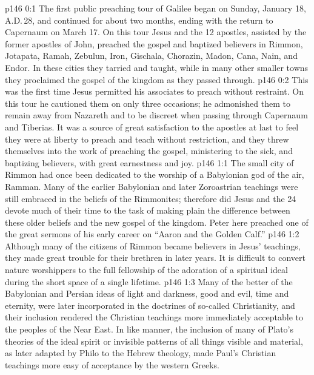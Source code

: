 \author{Midwayer Commission}
\vs p146 0:1 The first public preaching tour of Galilee began on Sunday, January 18, A.D.\,28, and continued for about two months, ending with the return to Capernaum on March 17. On this tour Jesus and the 12 apostles, assisted by the former apostles of John, preached the gospel and baptized believers in Rimmon, Jotapata, Ramah, Zebulun, Iron, Gischala, Chorazin, Madon, Cana, Nain, and Endor. In these cities they tarried and taught, while in many other smaller towns they proclaimed the gospel of the kingdom as they passed through.
\vs p146 0:2 This was the first time Jesus permitted his associates to preach without restraint. On this tour he cautioned them on only three occasions; he admonished them to remain away from Nazareth and to be discreet when passing through Capernaum and Tiberias. It was a source of great satisfaction to the apostles at last to feel they were at liberty to preach and teach without restriction, and they threw themselves into the work of preaching the gospel, ministering to the sick, and baptizing believers, with great earnestness and joy.
\vs p146 1:1 The small city of Rimmon had once been dedicated to the worship of a Babylonian god of the air, Ramman. Many of the earlier Babylonian and later Zoroastrian teachings were still embraced in the beliefs of the Rimmonites; therefore did Jesus and the 24 devote much of their time to the task of making plain the difference between these older beliefs and the new gospel of the kingdom. Peter here preached one of the great sermons of his early career on “Aaron and the Golden Calf.”
\vs p146 1:2 Although many of the citizens of Rimmon became believers in Jesus’ teachings, they made great trouble for their brethren in later years. It is difficult to convert nature worshippers to the full fellowship of the adoration of a spiritual ideal during the short space of a single lifetime.
\vs p146 1:3 \pc Many of the better of the Babylonian and Persian ideas of light and darkness, good and evil, time and eternity, were later incorporated in the doctrines of so\hyp{}called Christianity, and their inclusion rendered the Christian teachings more immediately acceptable to the peoples of the Near East. In like manner, the inclusion of many of Plato’s theories of the ideal spirit or invisible patterns of all things visible and material, as later adapted by Philo to the Hebrew theology, made Paul’s Christian teachings more easy of acceptance by the western Greeks.
